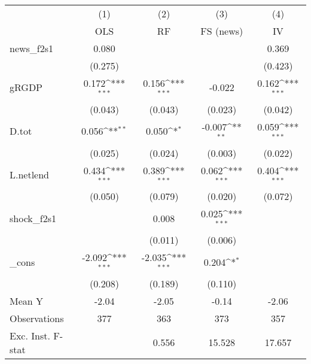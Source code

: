 {
\def\sym#1{\ifmmode^{#1}\else\(^{#1}\)\fi}
\begin{tabular}{l*{4}{c}}
\toprule
            &\multicolumn{1}{c}{(1)}&\multicolumn{1}{c}{(2)}&\multicolumn{1}{c}{(3)}&\multicolumn{1}{c}{(4)}\\
            &\multicolumn{1}{c}{OLS}&\multicolumn{1}{c}{RF}&\multicolumn{1}{c}{FS (news)}&\multicolumn{1}{c}{IV}\\
\midrule
news\_f2s1   &       0.080         &                     &                     &       0.369         \\
            &     (0.275)         &                     &                     &     (0.423)         \\
\addlinespace
gRGDP       &       0.172\sym{***}&       0.156\sym{***}&      -0.022         &       0.162\sym{***}\\
            &     (0.043)         &     (0.043)         &     (0.023)         &     (0.042)         \\
\addlinespace
D.tot       &       0.056\sym{**} &       0.050\sym{*}  &      -0.007\sym{**} &       0.059\sym{***}\\
            &     (0.025)         &     (0.024)         &     (0.003)         &     (0.022)         \\
\addlinespace
L.netlend   &       0.434\sym{***}&       0.389\sym{***}&       0.062\sym{***}&       0.404\sym{***}\\
            &     (0.050)         &     (0.079)         &     (0.020)         &     (0.072)         \\
\addlinespace
shock\_f2s1  &                     &       0.008         &       0.025\sym{***}&                     \\
            &                     &     (0.011)         &     (0.006)         &                     \\
\addlinespace
\_cons      &      -2.092\sym{***}&      -2.035\sym{***}&       0.204\sym{*}  &                     \\
            &     (0.208)         &     (0.189)         &     (0.110)         &                     \\
\midrule
Mean Y      &       -2.04         &       -2.05         &       -0.14         &       -2.06         \\
Observations&         377         &         363         &         373         &         357         \\
Exc. Inst. F-stat&                     &       0.556         &      15.528         &      17.657         \\
\bottomrule
\end{tabular}
}
